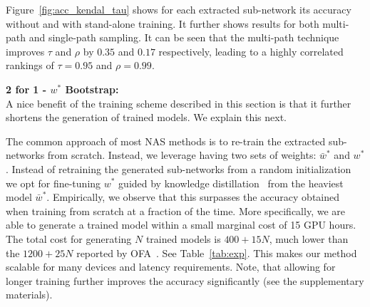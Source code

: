\documentclass[dvipsnames,table,xcdraw]{article}
\begin{document}
Figure~\ref{fig:acc_kendal_tau} shows for each extracted sub-network its accuracy without and with stand-alone training. It further shows results for both multi-path and single-path sampling.
 It can be seen that the multi-path technique improves $\tau$ and $\rho$ by $0.35$ and $0.17$ respectively, leading to a highly correlated rankings of $\tau\!=\!0.95$ and $\rho\!=\!0.99$.







\vspace{1.5mm}
\textbf{2 for 1 - $w^*$ Bootstrap:}\\
A nice benefit of the training scheme described in this section is that it further shortens the generation of trained models. We explain this next.

The common approach of most NAS methods is to re-train the extracted sub-networks from scratch.
Instead, we leverage having two sets of weights: $\bar{w}^*$ and $w^*$. Instead of retraining the generated sub-networks from a random initialization we opt for fine-tuning $w^*$ guided by knowledge distillation~\cite{KD} from the heaviest model $\bar{w}^*$.
Empirically, we observe that this surpasses the accuracy obtained when training from scratch at a fraction of the time. 
More specifically, we are able to generate a trained model within a small marginal cost of 15 GPU hours. The total cost for generating $N$ trained models is $400 + 15N$, much lower than the $1200 + 25N$ reported by OFA~\cite{OFA}. See Table~\ref{tab:exp}.
This makes our method scalable for many devices and latency requirements. 
Note, that allowing for longer training further improves the accuracy significantly (see the supplementary materials).
\end{document}
